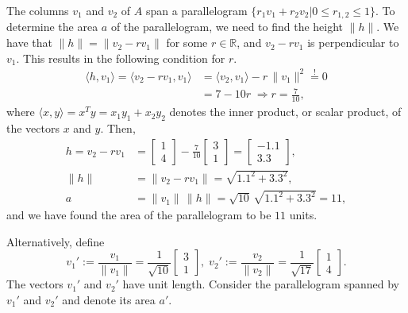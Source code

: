\documentclass[graybox]{svmult}
\newcommand{\R}{\mathds{R}}
\begin{document}
The columns $v_1$ and $v_2$ of $A$ span a parallelogram $\{r_1 v_1 + r_2
v_2 | 0\le r_{1,2}\le 1\}$.  To determine the area $a$ of the
parallelogram, we need to find the height $\| h\|$. We have that $\| h\| = \| v_2-r v_1\|$
for some $r\in\R$, and $v_2-r v_1$ is perpendicular to $v_1$. This results in the
following condition for $r$.
\begin{align*}
\langle h, v_1\rangle=\langle v_2- r v_1, v_1\rangle &= \langle v_2, v_1\rangle - r\, \|v_1\|^2 \stackrel{!}{=} 0\\
 &= 7 - 10r \; \Longrightarrow r=\frac{7}{10},
\end{align*}
where $\langle x, y\rangle = x^T y = x_1y_1 + x_2y_2$ denotes the inner product, or scalar product, of the vectors $x$ and $y$. Then,
\begin{align*}
h=v_2 - r v_1 &= \left[\begin{array}{c} 1\\ 4 \end{array}\right] - \frac{7}{10} \left[\begin{array}{c} 3\\ 1 \end{array}\right] = \left[\begin{array}{c} -1.1\\ 3.3 \end{array}\right],\\
\| h\| &= \| v_2 - r v_1\| = \sqrt{1.1^2 + 3.3^2},\\
a &= \| v_1\|\, \| h\| = \sqrt{10} \, \sqrt{1.1^2 + 3.3^2} = 11,
\end{align*}
and we have found the area of the parallelogram to be $11$ units.

Alternatively, define
\[
v_1' := \frac{v_1}{\| v_1\|} = \frac{1}{\sqrt{10}} \left[\begin{array}{c} 3\\ 1 \end{array}\right] ,\; v_2' := \frac{v_2}{\| v_2\|} = \frac{1}{\sqrt{17}} \left[\begin{array}{c} 1\\ 4 \end{array}\right].
\]
The vectors $v_1'$ and $v_2'$ have unit length. Consider the parallelogram
spanned by $v_1'$ and $v_2'$ and denote its area $a'$.
\end{document}

